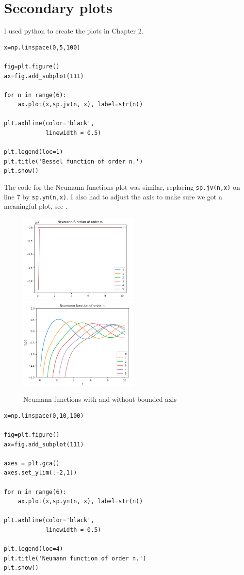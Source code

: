 \section{Secondary plots}\label{ss:secondary_plots}
I used python to create the plots in Chapter 2.
%
  \begin{lstlisting}[caption={Plot of bessel functions of integer order},label={lst:bessel_int_no}]
x=np.linspace(0,5,100)

fig=plt.figure()
ax=fig.add_subplot(111)

for n in range(6):
    ax.plot(x,sp.jv(n, x), label=str(n))

plt.axhline(color='black',
            linewidth = 0.5)

plt.legend(loc=1)
plt.title('Bessel function of order n.')
plt.show()\end{lstlisting}\par
%
The code for the Neumann functions plot was similar, replacing \verb!sp.jv(n,x)! on line 7 by \verb!sp.yn(n,x)!. I also had to adjust the axis to make sure we got a meaningful plot, see .\par
%
\begin{figure} \centering
  \includegraphics[width=6cm]{../figures/plot_neumann_unbounded_y}
  \includegraphics[width=6cm]{../figures/plot_neumann_int_order}
  \caption{Neumann functions with and without bounded axis}\label{fig:neumann_bounding_axis}
\end{figure}
%
\begin{lstlisting}[caption={Plot of neumann functions of integer order},label={lst:neumann_int_no}]
x=np.linspace(0,10,100)

fig=plt.figure()
ax=fig.add_subplot(111)

axes = plt.gca()
axes.set_ylim([-2,1])

for n in range(6):
    ax.plot(x,sp.yn(n, x), label=str(n))

plt.axhline(color='black',
            linewidth = 0.5)

plt.legend(loc=4)
plt.title('Neumann function of order n.')
plt.show()\end{lstlisting}\par
